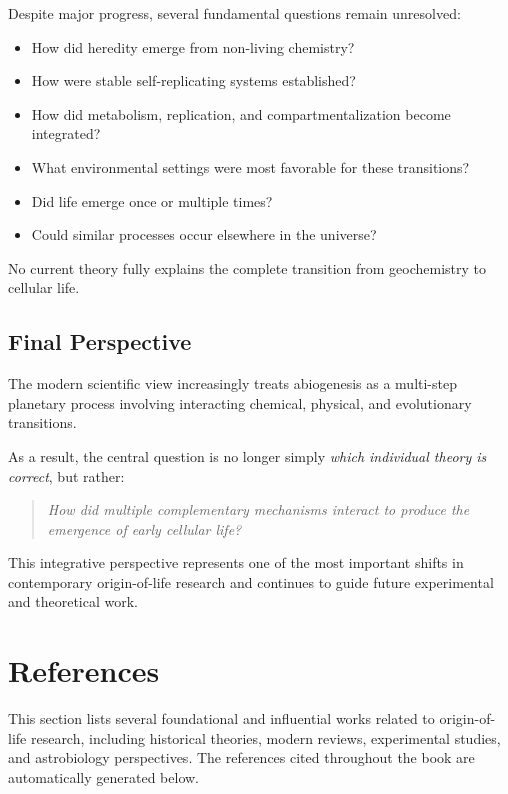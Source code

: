 \documentclass[
  oneside]{book}
\providecommand{\tightlist}{%
  \setlength{\itemsep}{0pt}\setlength{\parskip}{0pt}}
\begin{document}
Despite major progress, several fundamental questions remain unresolved:

\begin{itemize}
\tightlist
\item
  How did heredity emerge from non-living chemistry?
\item
  How were stable self-replicating systems established?
\item
  How did metabolism, replication, and compartmentalization become integrated?
\item
  What environmental settings were most favorable for these transitions?
\item
  Did life emerge once or multiple times?
\item
  Could similar processes occur elsewhere in the universe?
\end{itemize}

No current theory fully explains the complete transition from geochemistry to cellular life.

\section{Final Perspective}\label{final-perspective-1}

The modern scientific view increasingly treats abiogenesis as a multi-step planetary process involving interacting chemical, physical, and evolutionary transitions.

As a result, the central question is no longer simply \emph{which individual theory is correct}, but rather:

\begin{quote}
\emph{How did multiple complementary mechanisms interact to produce the emergence of early cellular life?}
\end{quote}

This integrative perspective represents one of the most important shifts in contemporary origin-of-life research and continues to guide future experimental and theoretical work.

\chapter*{References}\label{references}

This section lists several foundational and influential works related to origin-of-life research, including historical theories, modern reviews, experimental studies, and astrobiology perspectives. The references cited throughout the book are automatically generated below.
\end{document}
